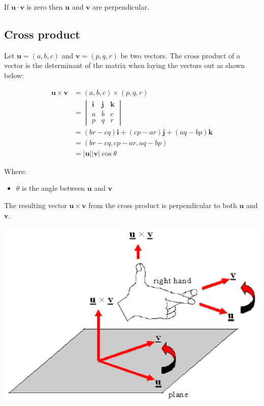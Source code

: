 \documentclass[11pt]{article}
\begin{document}
If \(\boldsymbol{u} \cdot \boldsymbol{v}\) is zero then \(\boldsymbol{u}\) and \(\boldsymbol{v}\) are perpendicular.

 \newpage

\subsection{Cross product}
\label{sec:orga3e7d3f}
Let \(\boldsymbol{u} = (a, b, c)\) and \(\boldsymbol{v} = (p, q, r)\) be two vectors. The cross product of a vector is the determinant of the matrix when laying the vectors out as shown below:

\begin{align*}
\boldsymbol{u} \times \boldsymbol{v}
&= (a, b, c) \times (p, q, r) \\
&= \begin{vmatrix}
\boldsymbol{i} & \boldsymbol{j} & \boldsymbol{k} \\
a & b & c \\
p & q & r
\end{vmatrix} \\
&= (br - cq) \boldsymbol{i} + (cp - ar) \boldsymbol{j} + (aq - bp) \boldsymbol{k} \\
&= (br - cq, cp - ar, aq - bp) \\
&= |\boldsymbol{u}| |\boldsymbol{v}| \cos \theta
\end{align*}

Where:
\begin{itemize}
\item \(\theta\) is the angle between \(\boldsymbol{u}\) and \(\boldsymbol{v}\)
\end{itemize}

The resulting vector \(\boldsymbol{u} \times \boldsymbol{v}\) from the cross product is perpendicular to both \(\boldsymbol{u}\) and \(\boldsymbol{v}\).

\begin{center}
\includegraphics[width=.9\linewidth]{./images/cross-product-right-hand-rule.png}
\end{center}
\end{document}
